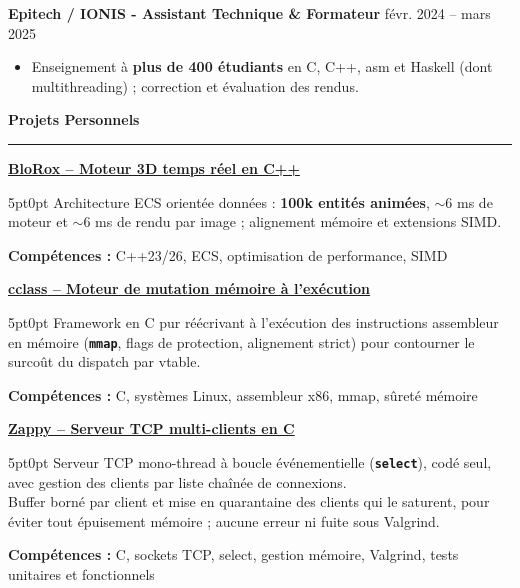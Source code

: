 \documentclass[9pt]{extarticle}
\begin{document}
\par\vspace{5pt}

{\bfseries Epitech / IONIS - Assistant Technique \& Formateur} \hfill févr. 2024 -- mars 2025
\begin{itemize}[noitemsep, topsep=0pt]
	\item Enseignement à {\bfseries plus de 400 étudiants} en C, C++, asm et Haskell (dont multithreading) ; correction et évaluation des rendus.
\end{itemize}

\par\vspace{5pt}

{\large\bfseries Projets Personnels}
\par\vspace{-8pt}
\rule{\linewidth}{0.4pt}
\par\vspace{5pt}

\underline{\bfseries \href{https://github.com/paulogarithm/blorox}{BloRox} -- Moteur 3D temps réel en C++}
\par
\begin{adjustwidth}{5pt}{0pt}
    Architecture ECS orientée données : {\bfseries 100k entités animées}, $\sim$6 ms de moteur et $\sim$6 ms de rendu par image ; alignement mémoire et extensions SIMD.
\end{adjustwidth}
\par
{\bfseries Compétences :} C++23/26, ECS, optimisation de performance, SIMD

\par\vspace{8pt}

\underline{\bfseries \href{https://github.com/paulogarithm/cclass}{cclass} -- Moteur de mutation mémoire à l'exécution}
\par
\begin{adjustwidth}{5pt}{0pt}
    Framework en C pur réécrivant à l'exécution des instructions assembleur en mémoire ({\bfseries \texttt{mmap}}, flags de protection, alignement strict) pour contourner le surcoût du dispatch par vtable.
\end{adjustwidth}
\par
{\bfseries Compétences :} C, systèmes Linux, assembleur x86, mmap, sûreté mémoire

\par\vspace{8pt}

\underline{\bfseries Zappy -- Serveur TCP multi-clients en C}
\par
\begin{adjustwidth}{5pt}{0pt}
    Serveur TCP mono-thread à boucle événementielle ({\bfseries \texttt{select}}), codé seul, avec gestion des clients par liste chaînée de connexions. \\
    Buffer borné par client et mise en quarantaine des clients qui le saturent, pour éviter tout épuisement mémoire ; aucune erreur ni fuite sous Valgrind.
\end{adjustwidth}
\par
{\bfseries Compétences :} C, sockets TCP, select, gestion mémoire, Valgrind, tests unitaires et fonctionnels
\end{document}
